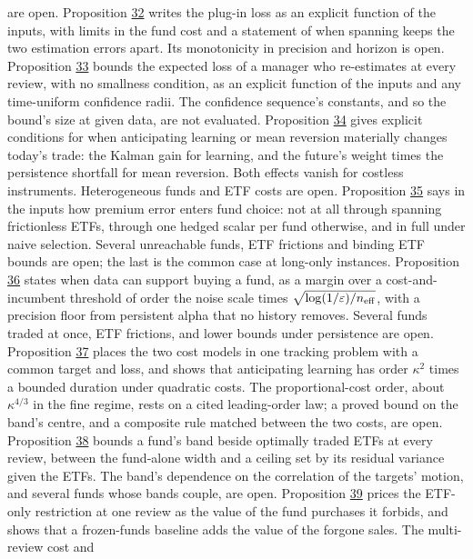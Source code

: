 \documentclass[11pt]{article}
\begin{document}
are open.
Proposition \hyperref[res:Proposition-32]{32} writes the plug-in loss as an explicit function of the
inputs, with limits in the fund cost and a statement of when spanning
keeps the two estimation errors apart. Its monotonicity in precision
and horizon is open.
Proposition \hyperref[res:Proposition-33]{33} bounds the expected loss of a manager who re-estimates
at every review, with no smallness condition, as an explicit function
of the inputs and any time-uniform confidence radii. The confidence
sequence's constants, and so the bound's size at given data, are not
evaluated.
Proposition \hyperref[res:Proposition-34]{34} gives explicit conditions for when anticipating
learning or mean reversion materially changes today's trade: the
Kalman gain for learning, and the future's weight times the
persistence shortfall for mean reversion. Both effects vanish for
costless instruments. Heterogeneous funds and ETF costs are open.
Proposition \hyperref[res:Proposition-35]{35} says in the inputs how premium error enters fund
choice: not at all through spanning frictionless ETFs, through one
hedged scalar per fund otherwise, and in full under naive selection.
Several unreachable funds, ETF frictions and binding ETF bounds are
open; the last is the common case at long-only instances.
Proposition \hyperref[res:Proposition-36]{36} states when data can support buying a fund, as a margin
over a cost-and-incumbent threshold of order the noise scale times
\(\sqrt{\log(1/\varepsilon)/n_{\rm eff}}\), with a precision floor from persistent alpha
that no history removes. Several funds traded at once, ETF frictions,
and lower bounds under persistence are open.
Proposition \hyperref[res:Proposition-37]{37} places the two cost models in one tracking problem with
a common target and loss, and shows that anticipating learning has
order \(\kappa^2\) times a bounded duration under quadratic costs. The
proportional-cost order, about \(\kappa^{4/3}\) in the fine regime, rests on a
cited leading-order law; a proved bound on the band's centre, and a
composite rule matched between the two costs, are open.
Proposition \hyperref[res:Proposition-38]{38} bounds a fund's band beside optimally traded ETFs at
every review, between the fund-alone width and a ceiling set by its
residual variance given the ETFs. The band's dependence on the
correlation of the targets' motion, and several funds whose bands
couple, are open.
Proposition \hyperref[res:Proposition-39]{39} prices the ETF-only restriction at one review as the
value of the fund purchases it forbids, and shows that a frozen-funds
baseline adds the value of the forgone sales. The multi-review cost and
\end{document}
